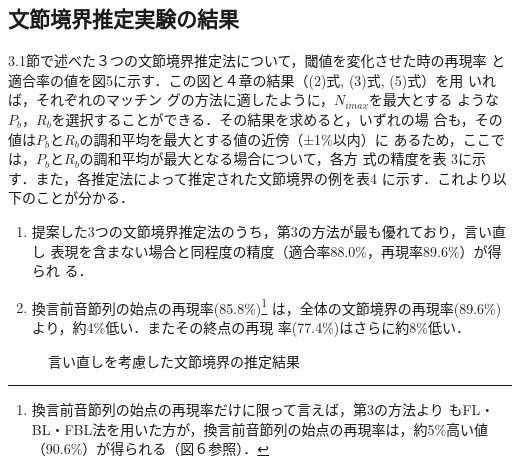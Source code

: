 \subsection{文節境界推定実験の結果}
3.1節で述べた３つの文節境界推定法について，閾値を変化させた時の再現率
と適合率の値を図5に示す．この図と４章の結果（(2)式, (3)式, (5)式）を用
いれば，それぞれのマッチン\break
グの方法に適したように，$N_{imax}$を最大とする
ような$P_b$，$R_b$を選択することができる．その結果を求めると，いずれの場
合も，その値は$P_b$と$R_b$の調和平均を最大とする値の近傍（±1\%以内）に
あるため，ここでは，$P_b$と$R_b$の調和平均が最大となる場合について，各方
式の精度を表\break
3に示す．また，各推定法によって推定された文節境界の例を表4
に示す．これより以下のことが分かる．
\Vspace
\begin{enumerate}
\item 提案した3つの文節境界推定法のうち，第3の方法が最も優れており，言い直し
表現を含まない場合と同程度の精度（適合率88.0\%，再現率89.6\%）が得られ
る．
\vspace{0em}
\item 換言前音節列の始点の再現率(85.8\%)\footnote{
換言前音節列の始点の再現率だけに限って言えば，第3の方法より
もFL・BL・FBL法を用いた方が，換言前音節列の始点の再現率は，約5\%高い値
（90.6\%）が得られる（図６参照）．}
は，全体の文節境界の再現率(89.6\%)より，約4\%低い．またその終点の再現
率(77.4\%)はさらに約8\%低い．
\end{enumerate}
\begin{figure}[tbp]
  \begin{center}
    \medskip
    \caption{言い直しを考慮した文節境界の推定結果}
    \label{fig:5}
  \end{center}
\end{figure}
